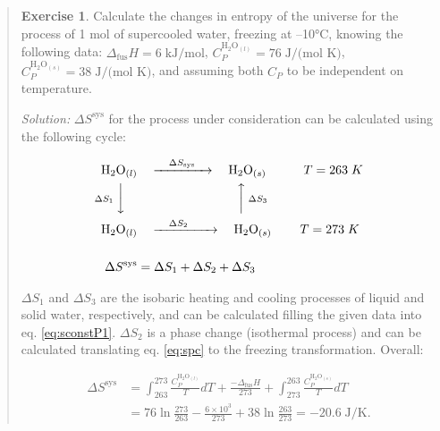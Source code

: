 \documentclass[
  9pt,
]{extbook}
\theoremstyle{definition}
\theoremstyle{definition}
\theoremstyle{definition}
\newtheorem{exercise}{Exercise}[chapter]
\theoremstyle{remark}
\begin{document}
\begin{quote}
\begin{exercise}
\protect\hypertarget{exr:supercooledEx}{}{\label{exr:supercooledEx} }Calculate the changes in entropy of the universe for the process of 1 mol of supercooled water, freezing at --10°C, knowing the following data: \(\Delta_{\mathrm{fus}}H = 6 \; \text{kJ/mol}\), \(C_P^{\mathrm{H}_2 \mathrm{O}_{(l)}}=76 \; \text{J/(mol K)}\), \(C_P^{\mathrm{H}_2 \mathrm{O}_{(s)}}=38 \; \text{J/(mol K)}\), and assuming both \(C_P\) to be independent on temperature.

\emph{Solution:} \(\Delta S^{\mathrm{sys}}\) for the process under consideration can be calculated using the following cycle:

\begin{equation}
\begin{aligned}
\mathrm{H}_2 \mathrm{O}_{(l)} & \quad \xrightarrow{\quad \Delta S_{\text{sys}} \quad} \quad \mathrm{H}_2 \mathrm{O}_{(s)} \qquad \quad T=263\;K\\
\scriptstyle{\Delta S_1} \; \bigg\downarrow \quad & \qquad \qquad \qquad \qquad \scriptstyle{\bigg\uparrow  \; \Delta S_3} \\
\mathrm{H}_2 \mathrm{O}_{(l)} & \quad \xrightarrow{\quad \Delta S_2 \qquad} \quad \mathrm{H}_2\mathrm{O}_{(s)} \qquad \; T=273\;K\\
\\
\Delta S^{\text{sys}} & = \Delta S_1 + \Delta S_2 + \Delta S_3
\end{aligned}
\label{eq:supercooledsyst}
\end{equation}

\(\Delta S_1\) and \(\Delta S_3\) are the isobaric heating and cooling processes of liquid and solid water, respectively, and can be calculated filling the given data into eq. \eqref{eq:sconstP1}. \(\Delta S_2\) is a phase change (isothermal process) and can be calculated translating eq. \eqref{eq:spc} to the freezing transformation. Overall:

\begin{equation}
\begin{aligned}
\Delta S^{\text{sys}} & = \int_{263}^{273} \frac{C_P^{\mathrm{H}_2 \mathrm{O}_{(l)}}}{T}dT+\frac{-\Delta_{\mathrm{fus}}H}{273}+\int_{273}^{263} \frac{C_P^{\mathrm{H}_2 \mathrm{O}_{(s)}}}{T}dT \\
& = 76 \ln \frac{273}{263} - \frac{6 \times 10^3}{273} + 38 \ln \frac{263}{273}= -20.6 \; \text{J/K}.
\end{aligned}
\label{eq:supercooledsyst2}
\end{equation}


\end{exercise}
\end{quote}
\end{document}
